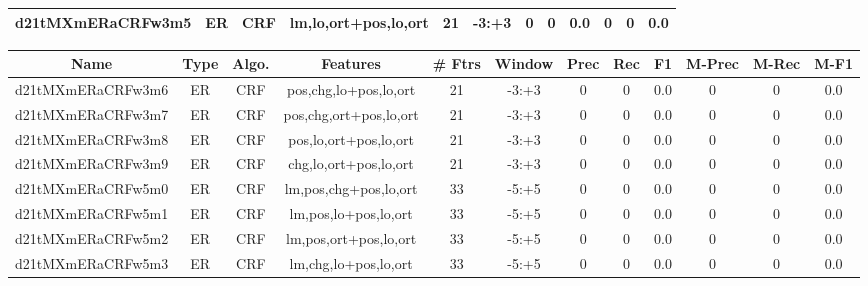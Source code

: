 \documentclass[a4paper]{article}
\begin{document}
\begin{landscape}
\begin{center}
\begin{tabular}{ |c|c|c|c|c|c|c|c|c|c|c|c|}
 
 	
 	\small{ d21tMXmERaCRFw3m5 } & ER & CRF & lm,lo,ort+pos,lo,ort  &  21 &  -3:+3  &  0 & 0 & 0.0  &  0 & 0 & 0.0 \\
 	
 \hline
\end{tabular}
\end{center}




\begin{center}
\begin{tabular}{ |c|c|c|c|c|c|c|c|c|c|c|c|} 
 \hline
 	Name & Type & Algo. & Features & \# Ftrs & Window & Prec & Rec & F1 & M-Prec & M-Rec & M-F1\\
 \hline

 	

 
 	
 	\small{ d21tMXmERaCRFw3m6 } & ER & CRF & pos,chg,lo+pos,lo,ort  &  21 &  -3:+3  &  0 & 0 & 0.0  &  0 & 0 & 0.0 \\
 	

 
 	
 	\small{ d21tMXmERaCRFw3m7 } & ER & CRF & pos,chg,ort+pos,lo,ort  &  21 &  -3:+3  &  0 & 0 & 0.0  &  0 & 0 & 0.0 \\
 	

 
 	
 	\small{ d21tMXmERaCRFw3m8 } & ER & CRF & pos,lo,ort+pos,lo,ort  &  21 &  -3:+3  &  0 & 0 & 0.0  &  0 & 0 & 0.0 \\
 	

 
 	
 	\small{ d21tMXmERaCRFw3m9 } & ER & CRF & chg,lo,ort+pos,lo,ort  &  21 &  -3:+3  &  0 & 0 & 0.0  &  0 & 0 & 0.0 \\
 	

 
 	
 	\small{ d21tMXmERaCRFw5m0 } & ER & CRF & lm,pos,chg+pos,lo,ort  &  33 &  -5:+5  &  0 & 0 & 0.0  &  0 & 0 & 0.0 \\
 	

 
 	
 	\small{ d21tMXmERaCRFw5m1 } & ER & CRF & lm,pos,lo+pos,lo,ort  &  33 &  -5:+5  &  0 & 0 & 0.0  &  0 & 0 & 0.0 \\
 	

 
 	
 	\small{ d21tMXmERaCRFw5m2 } & ER & CRF & lm,pos,ort+pos,lo,ort  &  33 &  -5:+5  &  0 & 0 & 0.0  &  0 & 0 & 0.0 \\
 	

 
 	
 	\small{ d21tMXmERaCRFw5m3 } & ER & CRF & lm,chg,lo+pos,lo,ort  &  33 &  -5:+5  &  0 & 0 & 0.0  &  0 & 0 & 0.0 \\
 	


\end{tabular}
\end{center}
\end{landscape}
\end{document}
